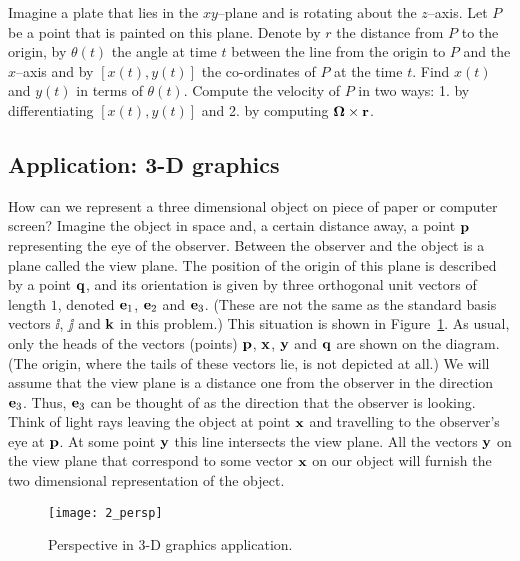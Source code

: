 \begin{problem}
\label{op1_20}
Imagine a plate that lies in the $xy$--plane and is rotating about the
$z$--axis. Let $P$ be a point that is painted on this plane. Denote by
$r$ the distance from $P$ to the origin, by $\theta(t)$ the angle at
time $t$ between the line from the origin to $P$ and the $x$--axis and
by $[x(t),y(t)]$ the co-ordinates of $P$ at the time $t$. Find $x(t)$
and $y(t)$ in terms of $\theta(t)$. Compute the velocity of $P$ in two
ways: 1. by differentiating $[x(t),y(t)]$ and 2. by computing
${\bf\Omega}\times{\bf r}$.
\end{problem}

\subsection{Application: 3-D graphics}

How can we represent a three dimensional object on piece of paper or 
computer screen? Imagine the object in space and, a certain distance away,
a point ${\bf p}$ representing the eye of the observer.
Between the observer and the object is a plane called the view plane.
The position of the origin of this plane is described by a point ${\bf q}$, and its
orientation is given by three orthogonal unit vectors of length $1$, denoted
${\bf e}_1$, ${\bf e}_2$ and ${\bf e}_3$. (These are not the same as the standard basis
vectors $\ii$, $\jj$ and ${\bf k}$ in this problem.) This situation is shown 
in Figure~\ref{fig_persp}. As usual, only the heads of the vectors 
(points) ${\bf p}$, ${\bf x}$, ${\bf y}$ and ${\bf q}$ are shown on the diagram. (The origin,
where the tails of these vectors lie, is not depicted at all.)
We will assume that the view plane is a distance one from the observer in the direction ${\bf e}_3$.
Thus, ${\bf e}_3$ can be thought of as the direction that the observer is looking.
Think of light rays leaving the object at point ${\bf x}$ and travelling to the observer's eye
at ${\bf p}$. At some point ${\bf y}$ this line intersects the view plane. All the vectors ${\bf y}$ on
the view plane that correspond to some vector ${\bf x}$ on our object will furnish the two
dimensional representation of the object.

\begin{figure}
\centerline{\texttt{[image: 2\_persp]}}
\caption{Perspective in 3-D graphics application. \label{fig_persp}}
\end{figure}


